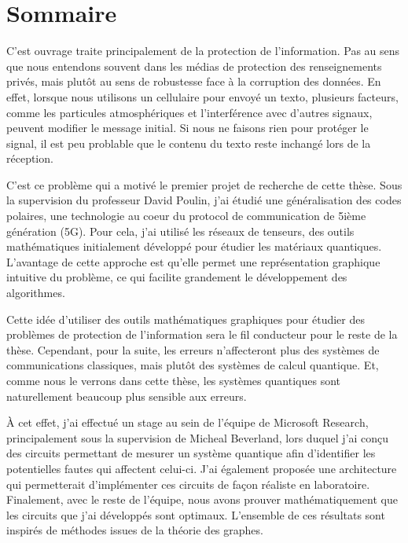 \begin{comment}
\end{comment}

\clearpage  %
\chapter*{Sommaire}

C'est ouvrage traite principalement de la protection de
l'information. 
Pas au sens que nous entendons souvent dans les médias de protection des renseignements privés,
mais plutôt au sens de robustesse face à la corruption des données.
En effet,
lorsque nous utilisons un cellulaire pour envoyé un texto,
plusieurs facteurs, 
comme les particules atmosphériques et l'interférence avec d'autres signaux,
peuvent modifier le message initial.
Si nous ne faisons rien pour protéger le signal,
il est peu problable que le contenu du texto reste inchangé
lors de la réception.

C'est ce problème qui a motivé le premier projet 
de recherche de cette thèse.
Sous la supervision du professeur David Poulin,
j'ai étudié une généralisation des codes polaires,
une technologie au coeur du protocol de communication de 5ième génération (5G).
Pour cela,
j'ai utilisé les réseaux de tenseurs, 
des outils mathématiques initialement développé pour étudier
les matériaux quantiques.
L'avantage de cette approche est qu'elle permet une représentation
graphique intuitive du problème, 
ce qui facilite grandement le développement des algorithmes.

Cette idée d'utiliser des outils mathématiques graphiques pour 
étudier des problèmes de protection de l'information
sera le fil conducteur pour le reste de la thèse.
Cependant, 
pour la suite, 
les erreurs n'affecteront plus des systèmes de communications classiques,
mais plutôt des systèmes de calcul quantique.
Et, comme nous le verrons dans cette thèse,
les systèmes quantiques sont naturellement beaucoup plus sensible aux erreurs.

À cet effet, 
j'ai effectué un stage au sein de l'équipe de Microsoft Research,
principalement sous la supervision de Micheal Beverland, 
lors duquel j'ai conçu des circuits permettant de mesurer un système quantique afin d'identifier
les potentielles fautes qui affectent celui-ci.
J'ai également proposée une architecture qui permetterait d'implémenter ces circuits
de façon réaliste en laboratoire.
Finalement, avec le reste de l'équipe, 
nous avons prouver mathématiquement que les circuits que j'ai développés sont optimaux.
L'ensemble de ces résultats sont inspirés de méthodes issues de la théorie des graphes.

